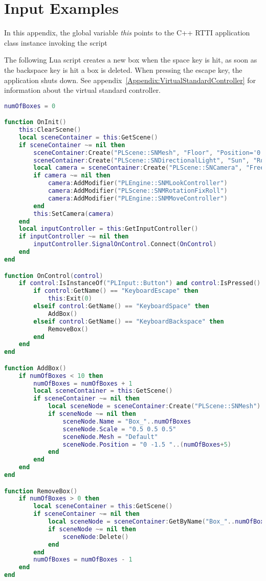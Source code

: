 \chapter{Input Examples}
\label{Appendix:InputExamples}
In this appendix, the global variable \emph{this} points to the C++ \ac{RTTI} application class instance invoking the script 

The following Lua script creates a new box when the space key is hit, as soon as the backspace key is hit a box is deleted. When pressing the escape key, the application shuts down. See appendix~\ref{Appendix:VirtualStandardController} for information about the virtual standard controller.

\begin{lstlisting}[language=lua]
numOfBoxes = 0

function OnInit()
	this:ClearScene()
	local sceneContainer = this:GetScene()
	if sceneContainer ~= nil then
		sceneContainer:Create("PLScene::SNMesh", "Floor", "Position='0 -2.1 5' Scale='4 0.1 4' Rotation='0 180 0' Mesh='Default'")
		sceneContainer:Create("PLScene::SNDirectionalLight", "Sun", "Rotation='45 0 0'")
		local camera = sceneContainer:Create("PLScene::SNCamera", "FreeCamera")
		if camera ~= nil then
			camera:AddModifier("PLEngine::SNMLookController")
			camera:AddModifier("PLScene::SNMRotationFixRoll")
			camera:AddModifier("PLEngine::SNMMoveController")
		end
		this:SetCamera(camera)
	end
	local inputController = this:GetInputController()
	if inputController ~= nil then
		inputController.SignalOnControl.Connect(OnControl)
	end
end

function OnControl(control)
	if control:IsInstanceOf("PLInput::Button") and control:IsPressed() then
		if control:GetName() == "KeyboardEscape" then
			this:Exit(0)
		elseif control:GetName() == "KeyboardSpace" then
			AddBox()
		elseif control:GetName() == "KeyboardBackspace" then
			RemoveBox()
		end
	end
end

function AddBox()
	if numOfBoxes < 10 then
		numOfBoxes = numOfBoxes + 1
		local sceneContainer = this:GetScene()
		if sceneContainer ~= nil then
			local sceneNode = sceneContainer:Create("PLScene::SNMesh")
			if sceneNode ~= nil then
				sceneNode.Name = "Box_"..numOfBoxes
				sceneNode.Scale = "0.5 0.5 0.5"
				sceneNode.Mesh = "Default"
				sceneNode.Position = "0 -1.5 "..(numOfBoxes+5)
			end
		end
	end
end

function RemoveBox()
	if numOfBoxes > 0 then
		local sceneContainer = this:GetScene()
		if sceneContainer ~= nil then
			local sceneNode = sceneContainer:GetByName("Box_"..numOfBoxes)
			if sceneNode ~= nil then
				sceneNode:Delete()
			end
		end
		numOfBoxes = numOfBoxes - 1
	end
end
\end{lstlisting}
